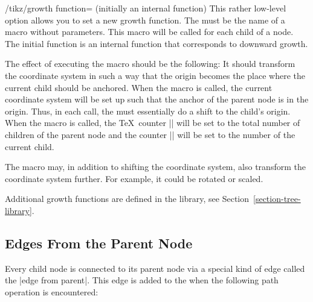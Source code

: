 \begin{key}{/tikz/growth function= (initially
    \normalfont an internal function)}
  This rather low-level option allows you to set a new growth
  function. The  must be the name of a macro without
  parameters. This macro will be called for each child of a node. The
  initial function is an internal function that corresponds to
  downward growth.

  The effect of executing the macro should be the following: It should
  transform the coordinate system in such a way that the origin
  becomes the place where the current child should be anchored. When
  the macro is called, the current coordinate system will be set up
  such that the anchor of the parent node is in the origin. Thus, in
  each call, the  must essentially do a shift to the
  child's origin. When the macro is called, the \TeX\ counter
  |\tikznumberofchildren| will be set to the total number of children
  of the parent node and the counter |\tikznumberofcurrentchild| will
  be set to the number of the current child.

  The macro may, in addition to shifting the coordinate system, also
  transform the coordinate system further. For example, it could be
  rotated or scaled.

  Additional growth functions are defined in the library, see
  Section~\ref{section-tree-library}.
\end{key}



\subsection{Edges From the Parent Node}

\label{section-edge-from-parent}

Every child node is connected to its parent node via a special kind of
edge called the |edge from parent|. This edge is added to the
 when the following path operation is encountered:

